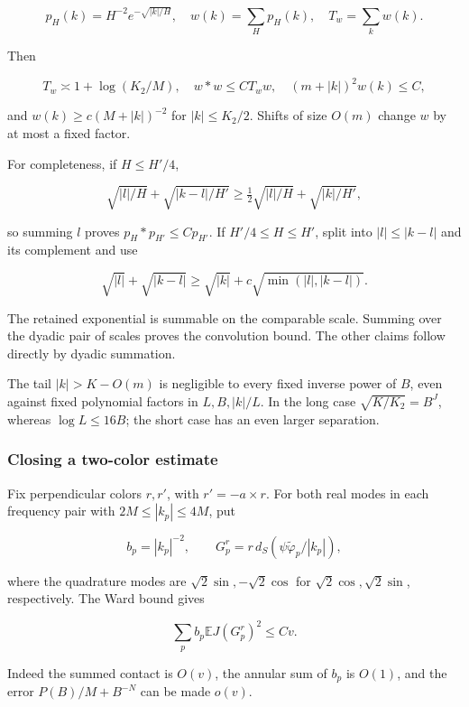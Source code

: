 \[
p_H(k)=H^{-2}e^{-\sqrt{|k|/H}},\quad
w(k)=\sum_Hp_H(k),\quad T_w=\sum_kw(k).
\]

Then

\begin{equation}
T_w\asymp1+\log(K_2/M),\quad
w*w\leq CT_ww,\quad
(m+|k|)^2w(k)\leq C,
\label{eq:pre:6-3}
\end{equation}

and \(w(k)\geq c(M+|k|)^{-2}\) for \(|k|\leq K_2/2\). Shifts of size \(O(m)\) change \(w\) by at most a fixed factor.

For completeness, if \(H\leq H'/4\),

\[
\sqrt{|l|/H}+\sqrt{|k-l|/H'}
\geq\tfrac12\sqrt{|l|/H}+\sqrt{|k|/H'},
\]

so summing \(l\) proves \(p_H*p_{H'}\leq Cp_{H'}\). If \(H'/4\leq H\leq H'\), split into \(|l|\leq|k-l|\) and its complement and use

\[
\sqrt{|l|}+\sqrt{|k-l|}\geq\sqrt{|k|}+c\sqrt{\min(|l|,|k-l|)}.
\]

The retained exponential is summable on the comparable scale. Summing over the dyadic pair of scales proves the convolution bound. The other claims follow directly by dyadic summation.

The tail \(|k|>K-O(m)\) is negligible to every fixed inverse power of \(B\), even against fixed polynomial factors in \(L,B,|k|/L\). In the long case \(\sqrt{K/K_2}=B^J\), whereas \(\log L\leq16B\); the short case has an even larger separation.

\subsubsection{Closing a two-color estimate}\label{pre:part-6-2}

Fix perpendicular colors \(r,r'\), with \(r'=-a\times r\). For both real modes in each frequency pair with \(2M\leq|k_p|\leq4M\), put

\[
b_p=|k_p|^{-2},\qquad
G_p^r=r\,d_S(\psi\widetilde\varphi_p/|k_p|),
\]

where the quadrature modes are \(\sqrt2\sin,-\sqrt2\cos\) for \(\sqrt2\cos,\sqrt2\sin\), respectively. The Ward bound gives

\begin{equation}
\sum_pb_p\mathbb E J(G_p^r)^2\leq Cv.
\label{eq:pre:6-4}
\end{equation}

Indeed the summed contact is \(O(v)\), the annular sum of \(b_p\) is \(O(1)\), and the error \(P(B)/M+B^{-N}\) can be made \(o(v)\).


